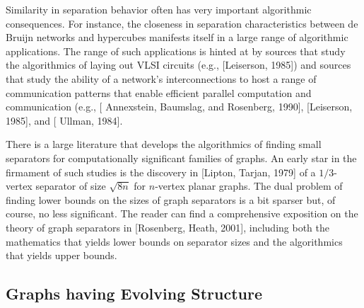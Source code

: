 \smallskip

Similarity in separation behavior often has very important algorithmic consequences.  For instance, the closeness in separation characteristics between de Bruijn networks and hypercubes manifests itself in a large range of algorithmic applications.  The range of such applications is hinted at by sources that study the algorithmics of laying out VLSI circuits (e.g., [Leiserson, 1985]) and sources that study the ability of a network's interconnections to host a range of communication patterns that enable efficient parallel computation and communication (e.g., [ Annexstein, Baumslag, and Rosenberg, 1990], [Leiserson, 1985], and [ Ullman, 1984].

\medskip

There is a large literature that develops the algorithmics of finding small separators for computationally significant families of graphs.  An early star in the firmament of such studies is the discovery in [Lipton, Tarjan, 1979] of a $1/3$-vertex separator of size $\sqrt{8n}$ for $n$-vertex planar graphs.  The dual problem of finding lower bounds on the sizes of graph separators is a bit sparser but, of course, no less significant.  The reader can find a comprehensive exposition on the theory of graph separators in [Rosenberg, Heath, 2001], including both the mathematics that yields lower bounds on separator sizes and the algorithmics that yields upper bounds.


\subsection{Graphs having Evolving Structure}
\label{sec:graph-evolve}

